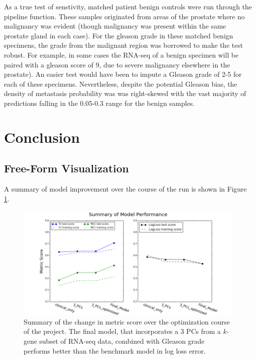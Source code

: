 \documentclass[final]{article}
\begin{document}
As a true test of senstivity, matched patient benign controls were run through
the pipeline function.  These samples originated from areas of the prostate
where no malignancy was evident (though malignancy was present within the same
prostate gland in each case).  For the gleason grade in these matched benign
specimens, the grade from the malignant region was borrowed to make the test
robust.  For example, in  some cases the RNA-seq of a benign specimen will be
paired with a gleason score of 9, due to severe malignancy elsewhere in the
prostate).  An easier test would have been to impute a Gleason grade of 2-5 for
each of these specimens.  Nevertheless, despite the potential Gleason bias, the
density of metastasis probability was was right-skewed with the vast majority of
predictions falling in the 0.05-0.3 range for the benign samples.



\section{Conclusion}

\subsection{Free-Form Visualization}
A summary of model improvement over the course of the run is shown in Figure \ref{fig:FM}.

\begin{figure}[h!]
  \centering
  \includegraphics[width=\textwidth]{FF}
  \caption{Summary of the change in metric score over the optimization course of the project.  The final model, that incorporates a 3 PCs from a \textit{k-}gene subset of RNA-seq data, combined with Gleason grade performs better than the benchmark model in log loss error.\label{fig:FM}}
\end{figure}
\end{document}
